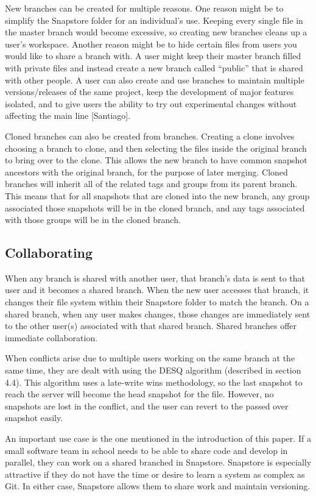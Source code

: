 New branches can be created for multiple reasons. One reason might be to simplify the Snapstore folder for an individual's use. Keeping every single file in the master branch would become excessive, so creating new branches cleans up a user's workspace. Another reason might be to hide certain files from users you would like to share a branch with. A user might keep their master branch filled with private files and instead create a new branch called ``public'' that is shared with other people. A user can also create and use branches to maintain multiple versions/releases of the same project, keep the development of major features isolated, and to give users the ability to try out experimental changes without affecting the main line [Santiago].

Cloned branches can also be created from branches. Creating a clone involves choosing a branch to clone, and then selecting the files inside the original branch to bring over to the clone. This allows the new branch to have common snapshot ancestors with the original branch, for the purpose of later merging. Cloned branches will inherit all of the related tags and groups from its parent branch. This means that for all snapshots that are cloned into the new branch, any group associated those snapshots will be in the cloned branch, and any tags associated with those groups will be in the cloned branch.

\subsection{Collaborating}

When any branch is shared with another user, that branch's data is sent to that user and it becomes a shared branch. When the new user accesses that branch, it changes their file system within their Snapstore folder to match the branch. On a shared branch, when any user makes changes, those changes are immediately sent to the other user(s) associated with that shared branch. Shared branches offer immediate collaboration.

When conflicts arise due to multiple users working on the same branch at the same time, they are dealt with using the DESQ algorithm (described in section 4.4). This algorithm uses a late-write wins methodology, so the last snapshot to reach the server will become the head snapshot for the file. However, no snapshots are lost in the conflict, and the user can revert to the passed over snapshot easily.

An important use case is the one mentioned in the introduction of this paper. If a small software team in school needs to be able to share code and develop in parallel, they can work on a shared branched in Snapstore. Snapstore is especially attractive if they do not have the time or desire to learn a system as complex as Git. In either case, Snapstore allows them to share work and maintain versioning.

